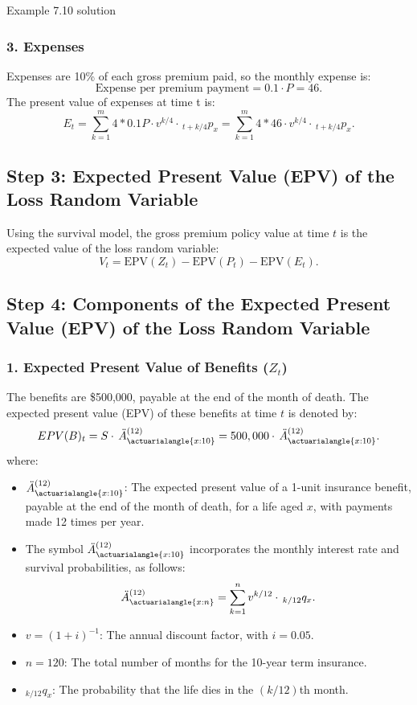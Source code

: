 \begin{solve}{}{Example 7.10 solution}
		\subsubsection*{3. Expenses}
		Expenses are 10\% of each gross premium paid, so the monthly expense is:
		\[
		\text{Expense per premium payment} = 0.1 \cdot P = 46.
		\]
		The present value of expenses at time t is:
		\[
		E_t = \sum_{k=1}^{m} 4 * 0.1P \cdot v^{k/4} \cdot \,_{t+k/4}p_{x} = \sum_{k=1}^{m} 4 * 46 \cdot v^{k/4} \cdot \,_{t+k/4}p_{x}. 
		\]
		
		\subsection*{Step 3: Expected Present Value (EPV) of the Loss Random Variable}
		Using the survival model, the gross premium policy value at time $t$ is the expected value of the loss random variable:
		\[
		V_t = \text{EPV}(Z_t) - \text{EPV}(P_t) - \text{EPV}(E_t).
		\]
		\subsection*{Step 4: Components of the Expected Present Value (EPV) of the Loss Random Variable}
		\subsubsection*{1. Expected Present Value of Benefits (\(Z_t\))}
		
		The benefits are \$500,000, payable at the end of the month of death. The expected present value (EPV) of these benefits at time \(t\) is denoted by:
		\[
		EPV(B)_t = S \cdot \,  \ddot{A}_{\actuarialangle{x:10}}^{(12)} = 500,000 \cdot \,  \ddot{A}_{\actuarialangle{x:10}}^{(12)}.
		\]
		where:
		\begin{itemize}
			\item \(\ddot{A}_{\actuarialangle{x:10}}^{(12)}\): The expected present value of a 1-unit insurance benefit, payable at the end of the month of death, for a life aged \(x\), with payments made 12 times per year.
			\item The symbol \(\ddot{A}_{\actuarialangle{x:10}}^{(12)}\) incorporates the monthly interest rate and survival probabilities, as follows:
			\[
			\ddot{A}_{\actuarialangle{x:n}}^{(12)} = \sum_{k=1}^{n} v^{k/12} \cdot \, _{k/12}q_x.
			\]
			\item \(v = (1+i)^{-1}\): The annual discount factor, with \(i = 0.05\).
			\item \(n = 120\): The total number of months for the 10-year term insurance.
			\item \(_{k/12}q_x\): The probability that the life dies in the \((k/12)\)th month.
		\end{itemize}
		

\end{solve}
